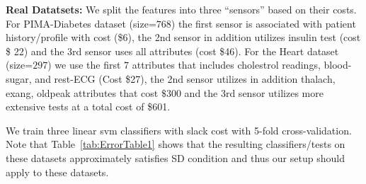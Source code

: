 {\bf Real Datatsets:} %
We split the features into three ``sensors'' based on their costs. For PIMA-Diabetes dataset (size=$768$) the first sensor is associated with patient history/profile with cost (\$6), the 2nd sensor in addition utilizes  insulin test (cost \$ 22) and the 3rd sensor uses all attributes (cost \$46). For the Heart dataset (size=$297$) we use the first $7$ attributes that includes cholestrol readings, blood-sugar, and rest-ECG (Cost \$27), the 2nd sensor utilizes in addition thalach, exang, oldpeak attributes that cost $\$300$  and the 3rd sensor utilizes more extensive tests at a total cost of \$601. 

We train three linear svm classifiers with slack cost with 5-fold cross-validation. Note that Table~\ref{tab:ErrorTable1} shows that the resulting classifiers/tests on these datasets approximately satisfies SD condition and thus our setup should apply to these datasets. 
%
%
%
%
